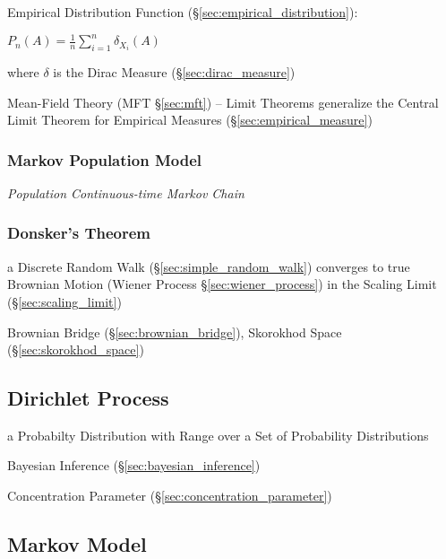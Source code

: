 Empirical Distribution Function (\S\ref{sec:empirical_distribution}):

$P_n(A) = \frac{1}{n}\sum_{i=1}^n \delta_{X_i}(A)$

where $\delta$ is the Dirac Measure (\S\ref{sec:dirac_measure})

\fist Mean-Field Theory (MFT \S\ref{sec:mft}) -- Limit Theorems generalize the
Central Limit Theorem for Empirical Measures (\S\ref{sec:empirical_measure})



\subsubsection{Markov Population Model}\label{sec:markov_population}

\emph{Population Continuous-time Markov Chain}



\subsubsection{Donsker's Theorem}\label{sec:donskers_theorem}

a Discrete Random Walk (\S\ref{sec:simple_random_walk}) converges to true
Brownian Motion (Wiener Process \S\ref{sec:wiener_process}) in the Scaling Limit
(\S\ref{sec:scaling_limit})

\fist Brownian Bridge (\S\ref{sec:brownian_bridge}), Skorokhod Space
(\S\ref{sec:skorokhod_space})



\subsection{Dirichlet Process}\label{sec:dirichlet_process}

a Probabilty Distribution with Range over a Set of Probability Distributions

Bayesian Inference (\S\ref{sec:bayesian_inference})

Concentration Parameter (\S\ref{sec:concentration_parameter})



\subsection{Markov Model}\label{sec:markov_model}

